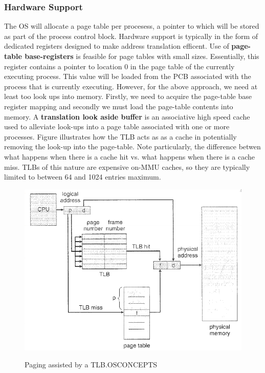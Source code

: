 \documentclass[10pt,a4paper]{article}
\begin{document}
\subsubsection{Hardware Support}
The OS will allocate a page table per procesess, a pointer to which will be stored as part of the process control block. Hardware support is typically in the form of dedicated registers designed to make address translation efficent. Use of {\bf page-table base-registers} is feasible for page tables with small sizes. Essentially, this register contains a pointer to location 0 in the page table of the currently executing process. This value will be loaded from the PCB associated with the process that is currently executing. 
\newline\newline
However, for the above approach, we need at least too look ups into memory. Firstly, we need to acquire the page-table base register mapping and secondly we must load the page-table contents into memory. A {\bf translation look aside buffer} is an associative high speed cache used to alleviate look-ups into a page table associated with one or more processes. Figure \cite{page-tlb} illustrates how the TLB acts as as a cache in potentially removing the look-up into the page-table. Note particularly, the difference betwen what happens when there is a cache hit vs. what happens when there is a cache miss.
\newline\newline
TLBs of this nature are expensive on-MMU caches, so they are typically limited to between 64 and 1024 entries maximum.
\begin{figure}
\caption{Paging assisted by a TLB.{OSCONCEPTS}}
\begin{center}
\includegraphics[scale=0.45]{../images/page-tlb.png}
\label{page-tlb}
\end{center}
\end{figure}
\end{document}

